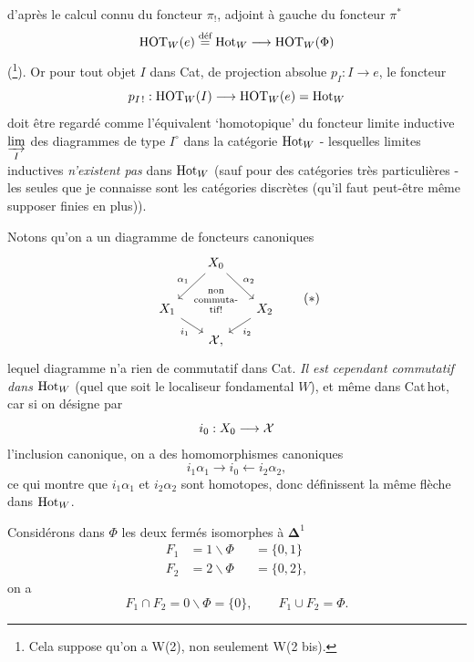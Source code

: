 \dgrchunkbegin

d'après le calcul connu du foncteur $\pi_!$, adjoint à gauche du foncteur $\pi^*$
\[
\mathrm{HOT}_W(e) \overset{\text{déf}}{=} \mathrm{Hot}_W \longrightarrow \mathrm{HOT}_W(\Phi)
\]
(\footnote[84]{Cela suppose qu'on a W(2), non seulement W(2 bis).}). Or pour tout objet $I$ dans Cat, de projection absolue $p_I : I \longrightarrow e$, le foncteur
\[
p_{I\,!} : \mathrm{HOT}_W(I) \longrightarrow \mathrm{HOT}_W(e) = \mathrm{Hot}_W
\]
doit être regardé comme l'équivalent `homotopique' du foncteur limite inductive $\varinjlim\limits_{I}$ des diagrammes de type $I^{\circ}$ dans la catégorie $\mathrm{Hot}_W$ - lesquelles limites inductives \textit{n'existent pas} dans $\mathrm{Hot}_W$ (sauf
pour des catégories très particulières - les seules que je connaisse sont les catégories discrètes (qu'il faut peut-être même supposer finies en plus)).

Notons qu'on a un diagramme de foncteurs canoniques
\[
\begin{tikzcd}[column sep=tiny, row sep=small, ampersand replacement=\&]
 \& X_0 \arrow[dl, "\alpha_1"'] \arrow[dr, "\alpha_2"] \& \\
X_1 \arrow[dr, "i_1"'] \& {\shortstack{\scriptsize non\\ \scriptsize commuta-\\ \scriptsize tif!}} \& X_2 \arrow[dl, "i_2"] \\
 \& \cX, \&
\end{tikzcd}
\tag*{$(*)$}
\]
lequel diagramme n'a rien de commutatif dans Cat. \textit{Il est cependant commutatif dans} $\mathrm{Hot}_W$ (quel que soit le localiseur fondamental $W$), et même dans Cat\,hot, car si on désigne par
\[
i_0 : X_0 \longrightarrow \mathcal{X}
\]
l'inclusion canonique, on a des homomorphismes canoniques
\[
i_1\alpha_1 \longrightarrow i_0 \longleftarrow i_2\alpha_2,
\]
ce qui montre que $i_1\alpha_1$ et $i_2\alpha_2$ sont homotopes, donc définissent la même flèche dans $\mathrm{Hot}_W$.

Considérons dans $\Phi$ les deux fermés isomorphes à $\boldsymbol{\Delta}^1$
\[
\begin{aligned}
F_1 &= 1\backslash\Phi &&= \{0,1\}\\
F_2 &= 2\backslash\Phi &&= \{0,2\},
\end{aligned}
\]
on a
\[
F_1\cap F_2 = 0\backslash\Phi = \{0\}, \qquad F_1\cup F_2 = \Phi.
\]

